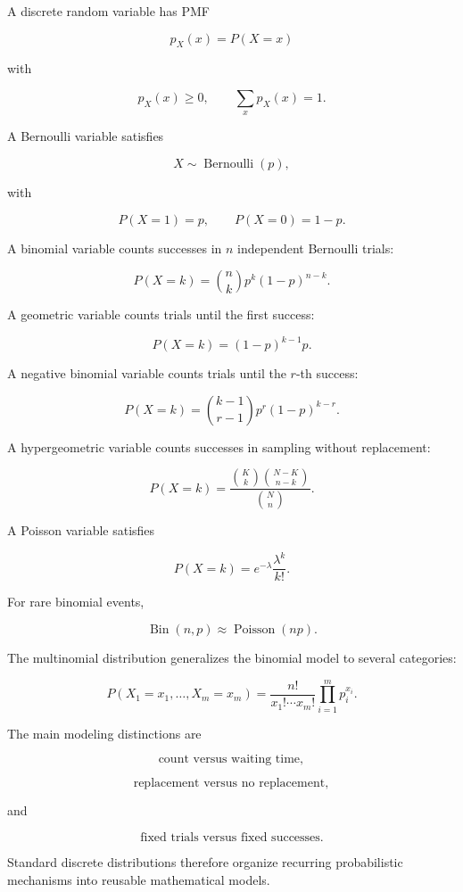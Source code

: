 A discrete random variable has PMF

\[
\boxed{
p_X(x)=P(X=x)
}
\]

with

\[
\boxed{
p_X(x)\geq0,
\qquad
\sum_xp_X(x)=1.
}
\]

A Bernoulli variable satisfies

\[
\boxed{
X\sim\operatorname{Bernoulli}(p),
}
\]

with

\[
P(X=1)=p,
\qquad
P(X=0)=1-p.
\]

A binomial variable counts successes in \(n\) independent Bernoulli
trials:

\[
\boxed{
P(X=k)
=
\binom nk
p^k(1-p)^{n-k}.
}
\]

A geometric variable counts trials until the first success:

\[
\boxed{
P(X=k)
=
(1-p)^{k-1}p.
}
\]

A negative binomial variable counts trials until the \(r\)-th success:

\[
\boxed{
P(X=k)
=
\binom{k-1}{r-1}
p^r(1-p)^{k-r}.
}
\]

A hypergeometric variable counts successes in sampling without
replacement:

\[
\boxed{
P(X=k)
=
\frac{
\binom Kk
\binom{N-K}{n-k}
}{
\binom Nn
}.
}
\]

A Poisson variable satisfies

\[
\boxed{
P(X=k)
=
e^{-\lambda}
\frac{\lambda^k}{k!}.
}
\]

For rare binomial events,

\[
\boxed{
\operatorname{Bin}(n,p)
\approx
\operatorname{Poisson}(np).
}
\]

The multinomial distribution generalizes the binomial model to several
categories:

\[
\boxed{
P(X_1=x_1,\ldots,X_m=x_m)
=
\frac{n!}{x_1!\cdots x_m!}
\prod_{i=1}^{m}p_i^{x_i}.
}
\]

The main modeling distinctions are

\[
\boxed{
\text{count versus waiting time},
}
\]

\[
\boxed{
\text{replacement versus no replacement},
}
\]

and

\[
\boxed{
\text{fixed trials versus fixed successes}.
}
\]

Standard discrete distributions therefore organize recurring
probabilistic mechanisms into reusable mathematical models.

